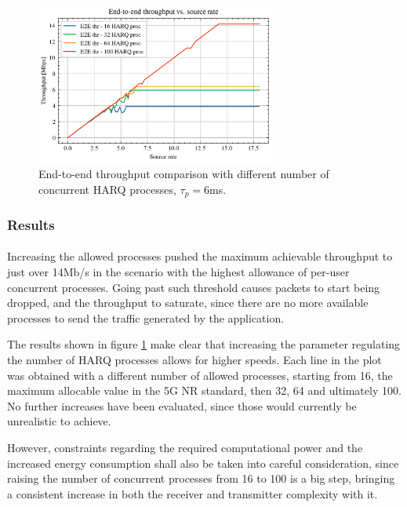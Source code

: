 \begin{figure}[ht]
    \centering
    \includegraphics[width=0.7\textwidth]{res/harq_numproc_new.png}
    \caption{End-to-end throughput comparison with different number of concurrent \ac{HARQ} processes, $\tau_p=6$ms.}
    \label{fig:harq-numproc}
\end{figure}

\subsubsection{Results}
\paragraph{}
Increasing the allowed processes pushed the maximum achievable throughput to just over 14Mb/s in the scenario with the highest allowance of per-user concurrent processes. Going past such threshold causes packets to start being dropped, and the throughput to saturate, since there are no more available processes to send the traffic generated by the application.

The results shown in figure \ref{fig:harq-numproc} make clear that increasing the parameter regulating the number of \ac{HARQ} processes allows for higher speeds. Each line in the plot was obtained with a different number of allowed processes, starting from 16, the maximum allocable value in the 5G \ac{NR} standard, then 32, 64 and ultimately 100. No further increases have been evaluated, since those would currently be unrealistic to achieve.

However, constraints regarding the required computational power and the increased energy consumption shall also be taken into careful consideration, since raising the number of concurrent processes from 16 to 100 is a big step, bringing a consistent increase in both the receiver and transmitter complexity with it.

